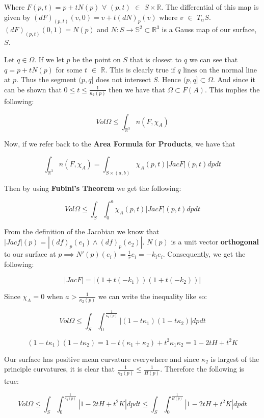 \documentclass[a4paper,12pt]{report}
\begin{document}
Where $F(p,t) = p + tN(p)$ $\forall$ $(p,t)$ $\in$ $S \times \mathbb{R}$. The differential of this map is given by $(dF)_{(p,t)}(v,0) = v + t(dN)_{p}(v)$ where $v$ $\in$ $T_{\alpha}S$. $(dF)_{(p,t)}(0,1) = N(p)$ and $N : S \rightarrow \mathbb{S}^{2} \subset \mathbb{R}^{3}$ is a Gauss map of our surface, $S$. 

Let $q \in \Omega$. If we let $p$ be the point on $S$ that is closest to $q$ we can see that $q = p + tN(p)$ for some $t$ $\in$ $\mathbb{R}$. This is clearly true if $q$ lines on the normal line at $p$. Thus the segment $(p,q]$ does not intersect $S$. Hence $(p,q] \subset \Omega$. And since it can be shown that $0 \leq t \leq \frac{1}{\kappa_{2}(p)}$ then we have that $\Omega \subset F(A)$. This implies the following:

\[ Vol\Omega \leq \int_{\mathbb{R}^{3}} n(F,\chi_{A})
\] 

Now, if we refer back to the \textbf{Area Formula for Products}, we have that


\[
\int_{\mathbb{R}^{3}} n(F,\chi_{A}) = \int_{S \times (a,b)} \chi_{A}(p,t)|Jac F |(p,t) dpdt
\]  

Then by using \textbf{Fubini's Theorem} we get the following:

\[Vol\Omega \leq \int_{S} \int_{0}^{a} \chi_{A}(p,t)|Jac F |(p,t) dpdt
\]

From the definition of the Jacobian we know that $|Jac f| (p) = |(df)_{p} (e_{1}) \wedge (df)_{p} (e_{2}) |$. $N(p)$ is a unit vector \textbf{orthogonal} to our surface at $p \implies N'(p)(e_{i}) = \frac{1}{r}e_{i} = -k_{i}e_{i}$. Consequently, we get the following:

\[
|Jac F| = |(1+t(-k_{1}))(1 + t(-k_{2}))|
\]

Since $\chi_{A} = 0$ when $a > \frac{1}{\kappa_{2}(p)}$ we can write the inequality like so:

\[
Vol \Omega \leq \int_{S} \int_{0}^{\frac{1}{\kappa_{2}(p)} } |(1-t\kappa_{1})(1-t\kappa_{2})| dpdt
\]

\[
(1-t\kappa_{1})(1-t\kappa_{2}) = 1 - t(\kappa_{1} + \kappa_{2}) + t^{2}\kappa_{1}\kappa_{2} = 1 - 2tH + t^{2}K
\]

Our surface has positive mean curvature everywhere and since $\kappa_{2}$ is largest of the principle curvatures, it is clear that $\frac{1}{\kappa_{2}(p)} \leq \frac{1}{H(p)}$. Therefore the following is true:

\[
Vol \Omega \leq \int_{S} \int_{0}^{\frac{1}{\kappa_{2}(p)} } |1-2tH + t^{2}K| dpdt \leq \int_{S} \int_{0}^{\frac{1}{H(p)}} |1-2tH + t^{2}K| dpdt 
\]
\end{document}
